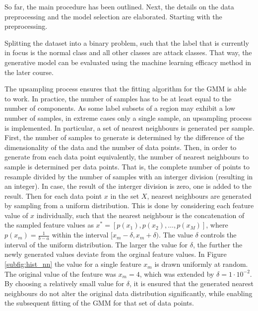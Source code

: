 \documentclass[../../main.tex]{subfiles}
\begin{document}
 So far, the main procedure has been outlined. Next, the details on the data preprocessing and the model selection are elaborated.
 Starting with the preprocessing.

 Splitting the dataset into a binary problem, such that the label that is currently in focus is the normal class and all other classes are attack classes. That way, the generative model can be evaluated using the machine learning efficacy method in the later course. 

 The upsampling process ensures that the fitting algorithm for the GMM is able to work. In practice, the number of samples has to be at least equal to the number of components. As some label subsets of a region may exhibit a low number of samples, in extreme cases only a single sample, an upsampling process is implemented. In particular, a set of nearest neighbours is generated per sample. First, the number of samples to generate is determined by the difference of the dimensionality of the data and the number of data points. Then, in order to generate from each data point equivalently, the number of nearest neighbours to sample is determined per data points. That is, the complete number of points to resample divided by the number of samples with an interger division (resulting in an integer). In case, the result of the interger division is zero, one is added to the result. Then for each data point $x$ in the set $X$, nearest neighbours are generated by sampling from a uniform distribution. This is done by considering each feature value of $x$ individually, such that the nearest neighbour is the concatenation of the sampled feature values as $x^* = [p(x_1), p(x_2), \dots, p(x_M)]$, where $p(x_m)=\frac{1}{b-a}$ within the interval $[x_m-\delta, x_m+\delta)$. The value $\delta$ controls the interval of the uniform distribution. The larger the value for $\delta$, the further the newly generated values deviate from the orginal feature values. In Figure \ref{subfig:hist_nn} the value for a single feature $x_m$ is drawn uniformly at random. The original value of the feature was $x_m=4$, which was extended by $\delta=1\cdot10^{-2}$. By choosing a relatively small value for $\delta$, it is ensured that the generated nearest neighbours do not alter the original data distribution significantly, while enabling the subsequent fitting of the GMM for that set of data points.
\end{document}
